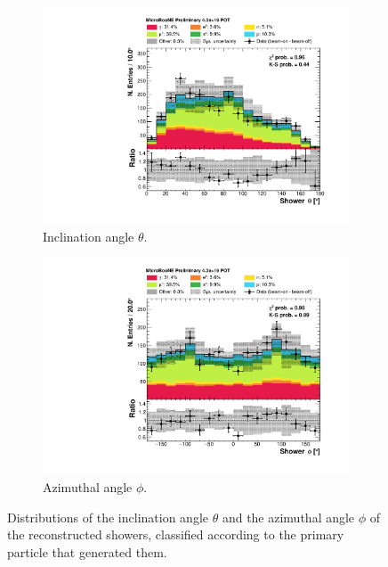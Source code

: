 \begin{figure}[htbp]
\centering
  \begin{subfigure}{0.49\textwidth}
    \includegraphics[width=\linewidth]{figures/h_shower_theta_pdg.pdf}
    \caption{Inclination angle $\theta$.} 
  \end{subfigure}
    \begin{subfigure}{0.49\textwidth}
    \includegraphics[width=\linewidth]{figures/h_shower_phi_pdg.pdf}
    \caption{Azimuthal angle $\phi$.} 
  \end{subfigure}
  \caption{{Distributions of the inclination angle $\theta$ and the azimuthal angle $\phi$ of the reconstructed showers, classified according to the primary particle that generated them.}}\label{fig:thetaphi_pdg}
\end{figure}

